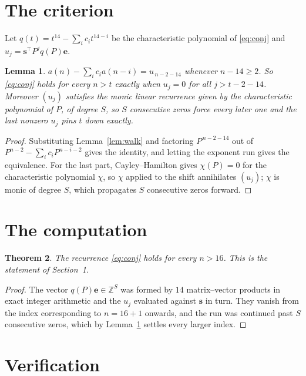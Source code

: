 \documentclass[11pt,a4paper]{article}
\theoremstyle{plain}
\newtheorem{theorem}{Theorem}
\newtheorem{lemma}[theorem]{Lemma}
\theoremstyle{definition}
\begin{document}
\section{The criterion}

Let $q(t)=t^{14}-\sum_i c_i t^{14-i}$ be the characteristic polynomial of
\eqref{eq:conj} and $u_j=\mathbf{s}^{\!\top}P^{j}q(P)\mathbf{e}$.

\begin{lemma}\label{lem:crit}
$a(n)-\sum_i c_i a(n-i)=u_{\,n-2-14}$ whenever $n-14\ge2$. So \eqref{eq:conj}
holds for every $n>t$ exactly when $u_j=0$ for all $j>t-2-14$. Moreover $(u_j)$
satisfies the monic linear recurrence given by the characteristic polynomial of $P$, of
degree $S$, so $S$ consecutive zeros force every later one and the last nonzero $u_j$ pins
$t$ down exactly.
\end{lemma}

\begin{proof}
Substituting Lemma~\ref{lem:walk} and factoring $P^{\,n-2-14}$ out of
$P^{n-2}-\sum_i c_i P^{n-i-2}$ gives the identity, and letting the exponent run gives the
equivalence. For the last part, Cayley--Hamilton gives $\chi(P)=0$ for the characteristic
polynomial $\chi$, so $\chi$ applied to the shift annihilates $(u_j)$; $\chi$ is monic of
degree $S$, which propagates $S$ consecutive zeros forward.
\end{proof}

\section{The computation}

\begin{theorem}
The recurrence \eqref{eq:conj} holds for every $n>16$. This is the statement of
Section~1.
\end{theorem}

\begin{proof}
The vector $q(P)\mathbf{e}\in\mathbb{Z}^{S}$ was formed by $14$ matrix--vector
products in exact integer arithmetic and the $u_j$ evaluated against $\mathbf{s}$ in turn.
They vanish from the index corresponding to $n=16+1$ onwards, and the run was continued
past $S$ consecutive zeros, which by Lemma~\ref{lem:crit} settles every larger index.
\end{proof}

\section{Verification}
\end{document}
